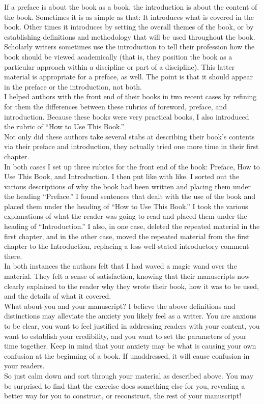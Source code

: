   If a preface is about the book as a book, the introduction is about the content of the book. 
    Sometimes it is as simple as that: It introduces what is covered in the book. Other times it 
    introduces by setting the overall themes of the book, or by establishing definitions and 
    methodology that will be used throughout the book. Scholarly writers sometimes use the 
    introduction to tell their profession how the book should be viewed academically (that is, they 
    position the book as a particular approach within a discipline or part of a discipline). This 
    latter material is appropriate for a preface, as well. The point is that it should appear in the 
    preface or the introduction, not both. \\
  I helped authors with the front end of their books in two recent cases by refining for them the 
    differences between these rubrics of foreword, preface, and introduction. Because these books 
    were very practical books, I also introduced the rubric of “How to Use This Book.” \\
  Not only did these authors take several stabs at describing their book’s contents via their 
    preface and introduction, they actually tried one more time in their first chapter. \\
  In both cases I set up three rubrics for the front end of the book: Preface, How to Use This Book, 
    and Introduction. I then put like with like. I sorted out the various descriptions of why the 
    book had been written and placing them under the heading “Preface.” I found sentences that dealt 
    with the use of the book and placed them under the heading of “How to Use This Book.” I took the 
    various explanations of what the reader was going to read and placed them under the heading of 
    “Introduction.” I also, in one case, deleted the repeated material in the first chapter, and in 
    the other case, moved the repeated material from the first chapter to the Introduction, 
    replacing a less-well-stated introductory comment there. \\
  In both instances the authors felt that I had waved a magic wand over the material. They felt a 
    sense of satisfaction, knowing that their manuscripts now clearly explained to the reader why 
    they wrote their book, how it was to be used, and the details of what it covered. \\
  What about you and your manuscript? I believe the above definitions and distinctions may alleviate 
    the anxiety you likely feel as a writer. You are anxious to be clear, you want to feel justified 
    in addressing readers with your content, you want to establish your credibility, and you want to 
    set the parameters of your time together. Keep in mind that your anxiety may be what is causing 
    your own confusion at the beginning of a book. If unaddressed, it will cause confusion in your 
    readers. \\
  So just calm down and sort through your material as described above. You may be surprised to find 
    that the exercise does something else for you, revealing a better way for you to construct, or 
    reconstruct, the rest of your manuscript!

